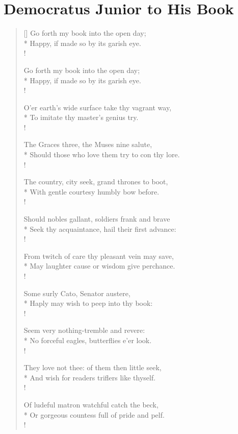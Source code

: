 \chapter{Democratus Junior to His Book}
\settowidth{\versewidth}{Should known or unknown student, freed from strife}
\begin{verse}[\versewidth]
Go forth my book into the open day;\\*
Happy, if made so by its garish eye. \\!

Go forth my book into the open day;\\*
Happy, if made so by its garish eye. \\!

O'er earth's wide surface take thy vagrant way,\\*
To imitate thy master's genius try. \\!

The Graces three, the Muses nine salute,\\*
Should those who love them try to con thy lore.\\!

The country, city seek, grand thrones to boot,\\*
With gentle courtesy humbly bow before.\\!

Should nobles gallant, soldiers frank and brave\\*
Seek thy acquaintance, hail their first advance:\\!

From twitch of care thy pleasant vein may save,\\*
May laughter cause or wisdom give perchance.\\!

Some surly Cato, Senator austere,\\*
Haply may wish to peep into thy book:\\!

Seem very nothing-tremble and revere:\\*
No forceful eagles, butterflies e'er look.\\!

They love not thee: of them then little seek,\\*
And wish for readers triflers like thyself.\\!

Of ludeful matron watchful catch the beck,\\*
Or gorgeous countess full of pride and pelf.\\!


\end{verse}
